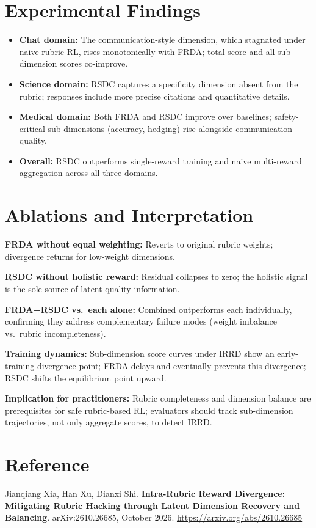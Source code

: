 \documentclass[10pt,twocolumn]{article}
\begin{document}
\section{Experimental Findings}

\begin{itemize}[itemsep=2pt,parsep=0pt]
  \item \textbf{Chat domain:} The communication-style dimension, which
    stagnated under naive rubric RL, rises monotonically with FRDA;
    total score and all sub-dimension scores co-improve.
  \item \textbf{Science domain:} RSDC captures a specificity dimension
    absent from the rubric; responses include more precise citations and
    quantitative details.
  \item \textbf{Medical domain:} Both FRDA and RSDC improve over baselines;
    safety-critical sub-dimensions (accuracy, hedging) rise alongside
    communication quality.
  \item \textbf{Overall:} RSDC outperforms single-reward training and
    naive multi-reward aggregation across all three domains.
\end{itemize}

\section{Ablations and Interpretation}

\textbf{FRDA without equal weighting:} Reverts to original rubric weights;
divergence returns for low-weight dimensions.

\textbf{RSDC without holistic reward:} Residual collapses to zero; the
holistic signal is the sole source of latent quality information.

\textbf{FRDA+RSDC vs.\ each alone:} Combined outperforms each individually,
confirming they address complementary failure modes (weight imbalance vs.\
rubric incompleteness).

\textbf{Training dynamics:} Sub-dimension score curves under IRRD show
an early-training divergence point; FRDA delays and eventually prevents this
divergence; RSDC shifts the equilibrium point upward.

\textbf{Implication for practitioners:} Rubric completeness and dimension
balance are prerequisites for safe rubric-based RL; evaluators should
track sub-dimension trajectories, not only aggregate scores, to detect IRRD.

\section*{Reference}

Jianqiang Xia, Han Xu, Dianxi Shi.
\textbf{Intra-Rubric Reward Divergence: Mitigating Rubric Hacking through
Latent Dimension Recovery and Balancing}.
arXiv:2610.26685, October 2026.
\url{https://arxiv.org/abs/2610.26685}
\end{document}

